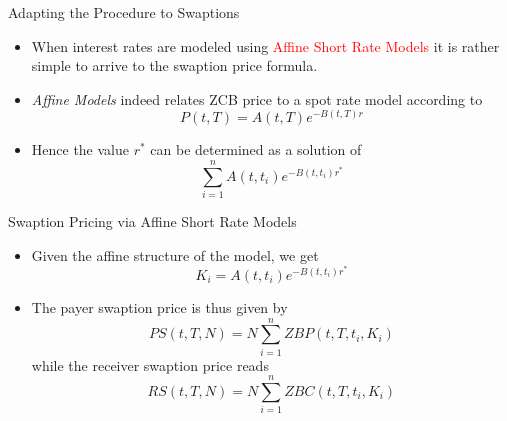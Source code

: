 \documentclass{beamer}
\begin{document}
\begin{frame}{Adapting the Procedure to Swaptions}
	\begin{itemize}
		\item When interest rates are modeled using \textcolor{red}{Affine Short Rate Models} it is rather simple to arrive to the swaption price formula.
		\item \emph{Affine Models} indeed relates ZCB price to a spot rate model according to 
		\begin{equation*}
			P(t,T) = A(t,T)e^{-B(t,T)r}
		\end{equation*} 
		\item Hence the value $r^*$ can be determined as a solution of 
		\begin{equation*}
		\sum_{i=1}^n A(t,t_i)e^{-B(t,t_i)r^*}
		\end{equation*}		
	\end{itemize}
\end{frame}

\begin{frame}{Swaption Pricing via Affine Short Rate Models}
	\begin{itemize}
		\item Given the affine structure of the model, we get
		\begin{equation*}
			K_i = A(t,t_i)e^{-B(t,t_i)r^*}
		\end{equation*}
		\item The payer swaption price is thus given by
		\begin{equation}
			PS(t,T,N) = N\sum_{i=1}^n ZBP(t,T,t_i,K_i)
		\end{equation}
		while the receiver swaption price reads
		\begin{equation}
			RS(t,T,N) = N\sum_{i=1}^n ZBC(t,T,t_i,K_i)
		\end{equation}
	\end{itemize}
\end{frame}
\end{document}
